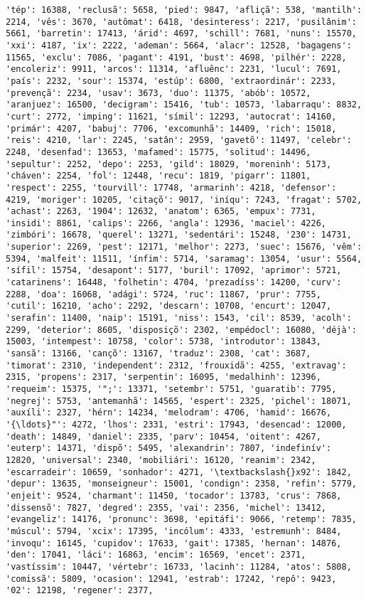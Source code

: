 \begin{Verbatim}[commandchars=\\\{\}]
'tép': 16388, 'reclusã': 5658, 'pied': 9847, 'afliçã': 538, 'mantilh': 2214, 'vês': 3670, 'autômat': 6418, 'desinteress': 2217, 'pusilânim': 5661, 'barretin': 17413, 'árid': 4697, 'schill': 7681, 'nuns': 15570, 'xxi': 4187, 'ix': 2222, 'ademan': 5664, 'alacr': 12528, 'bagagens': 11565, 'exclu': 7086, 'pagant': 4191, 'bust': 4698, 'pilhér': 2228, 'encoleriz': 9911, 'arcos': 11314, 'afluênc': 2231, 'lucul': 7691, 'país': 2232, 'sour': 15374, 'estúp': 6800, 'extraordinár': 2233, 'prevençã': 2234, 'usav': 3673, 'duo': 11375, 'abób': 10572, 'aranjuez': 16500, 'decigram': 15416, 'tub': 10573, 'labarraqu': 8832, 'curt': 2772, 'imping': 11621, 'símil': 12293, 'autocrat': 14160, 'primár': 4207, 'babuj': 7706, 'excomunhã': 14409, 'rich': 15018, 'reis': 4210, 'lar': 2245, 'satân': 2959, 'gavetõ': 11497, 'celebr': 2248, 'desenfad': 13653, 'mafamed': 15775, 'solitud': 14496, 'sepultur': 2252, 'depo': 2253, 'gild': 18029, 'moreninh': 5173, 'cháven': 2254, 'fol': 12448, 'recu': 1819, 'pigarr': 11801, 'respect': 2255, 'tourvill': 17748, 'armarinh': 4218, 'defensor': 4219, 'moriger': 10205, 'citaçõ': 9017, 'iníqu': 7243, 'fragat': 5702, 'achast': 2263, '1904': 12632, 'anatom': 6365, 'empux': 7731, 'insidi': 8861, 'calips': 2266, 'angla': 12936, 'maciel': 4226, 'zimbóri': 16678, 'querel': 13271, 'sedentári': 15248, '230': 14731, 'superior': 2269, 'pest': 12171, 'melhor': 2273, 'suec': 15676, 'vêm': 5394, 'malfeit': 11511, 'ínfim': 5714, 'saramag': 13054, 'usur': 5564, 'sífil': 15754, 'desapont': 5177, 'buril': 17092, 'aprimor': 5721, 'catarinens': 16448, 'folhetin': 4704, 'prezadíss': 14200, 'curv': 2288, 'doa': 16068, 'adági': 5724, 'ruc': 11867, 'prur': 7755, 'cutil': 16210, 'acho': 2292, 'descarn': 10708, 'encurt': 12047, 'serafin': 11400, 'naip': 15191, 'niss': 1543, 'cil': 8539, 'acolh': 2299, 'deterior': 8605, 'disposiçõ': 2302, 'empédocl': 16080, 'déjà': 15003, 'intempest': 10758, 'color': 5738, 'introdutor': 13843, 'sansã': 13166, 'cançõ': 13167, 'traduz': 2308, 'cat': 3687, 'timorat': 2310, 'independent': 2312, 'frouxidã': 4255, 'extravag': 2315, 'propens': 2317, 'serpentin': 16095, 'medalhinh': 12396, 'requeim': 15375, '";': 13371, 'setembr': 5751, 'guaratib': 7795, 'negrej': 5753, 'antemanhã': 14565, 'espert': 2325, 'pichel': 18071, 'auxíli': 2327, 'hérn': 14234, 'melodram': 4706, 'hamid': 16676, '{\ldots}"': 4272, 'lhos': 2331, 'estri': 17943, 'desencad': 12000, 'death': 14849, 'daniel': 2335, 'parv': 10454, 'oitent': 4267, 'euterp': 14371, 'dispõ': 5495, 'alexandrin': 7807, 'indefinív': 12820, 'universal': 2340, 'mobiliári': 16120, 'reanim': 2342, 'escarradeir': 10659, 'sonhador': 4271, '\textbackslash{}x92': 1842, 'depur': 13635, 'monseigneur': 15001, 'condign': 2358, 'refin': 5779, 'enjeit': 9524, 'charmant': 11450, 'tocador': 13783, 'crus': 7868, 'dissensõ': 7827, 'degred': 2355, 'vai': 2356, 'michel': 13412, 'evangeliz': 14176, 'pronunc': 3698, 'epitáfi': 9066, 'retemp': 7835, 'múscul': 5794, 'xcix': 17395, 'incólum': 4333, 'estremunh': 8484, 'invoqu': 16145, 'cupidov': 17633, 'gait': 17385, 'hernan': 14876, 'den': 17041, 'láci': 16863, 'encim': 16569, 'encet': 2371, 'vastíssim': 10447, 'vértebr': 16733, 'lacinh': 11284, 'atos': 5808, 'comissã': 5809, 'ocasion': 12941, 'estrab': 17242, 'repô': 9423, '02': 12198, 'regener': 2377, 
\end{Verbatim}
